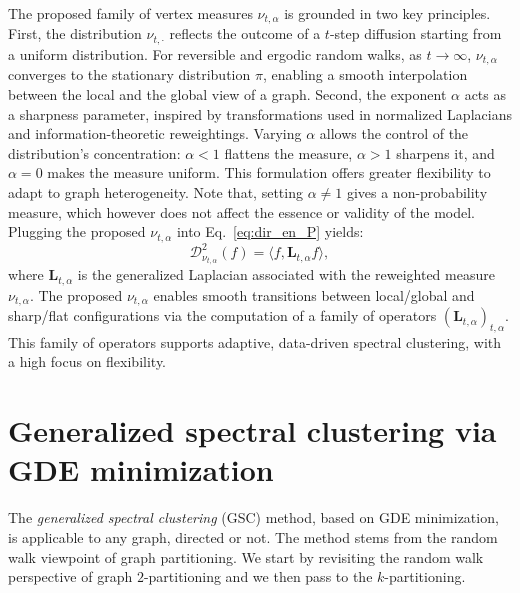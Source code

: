 \documentclass[10pt]{article} %
\def\eqref#1{equation~\ref{#1}}
\def\rmL{{\mathbf{L}}}
\newcommand{\GDE}{GDE\xspace}
\newcommand{\D}[2]{\mathcal{D}^2_{#1}(#2)}
\renewcommand{\eqref}[1]{\ref{#1}}
\begin{document}
%
The proposed family of vertex measures $\nu_{t, \alpha}$ is grounded in two key principles. First, the distribution $\nu_{t, \cdot}$ reflects the outcome of a $t$-step diffusion starting from a uniform distribution. For reversible and ergodic random walks, as $t \to \infty$, $\nu_{t, \alpha}$ converges to the stationary distribution $\pi$, enabling a smooth interpolation between the local and the global view of a graph. Second, the exponent $\alpha$ acts as a sharpness parameter, inspired by transformations used in normalized Laplacians and information-theoretic reweightings. Varying $\alpha$ allows the control of the distribution's concentration: $\alpha < 1$ flattens the measure, $\alpha > 1$ sharpens it, and $\alpha = 0$ makes the measure uniform. This formulation offers greater flexibility to adapt to graph heterogeneity. Note that, setting $\alpha \neq 1$ gives a non-probability measure, which however does not affect the essence or validity of the model. %
Plugging the proposed $\nu_{t,\alpha}$ into Eq.~\eqref{eq:dir_en_P} yields:
\begin{equation} \label{gde:power_alpha}
  \D{\nu_{t,\alpha}}{f} = \langle f, \rmL_{t,\alpha} f \rangle,
\end{equation}
%
where $\rmL_{t,\alpha}$ is the generalized Laplacian associated with the reweighted measure $\nu_{t,\alpha}$. The proposed $\nu_{t,\alpha}$ %
enables smooth transitions between local/global and sharp/flat configurations via the computation of a family of operators $(\rmL_{t, \alpha})_{t, \alpha}$. This family of operators supports adaptive, data-driven spectral clustering, with a high focus on flexibility.

\section{Generalized spectral clustering via GDE minimization} \label{sec:gsc}
%
The \emph{generalized spectral clustering} (GSC) method, based on \GDE minimization, is applicable to any graph, directed or not. The method stems from the random walk viewpoint of graph partitioning. We start by revisiting the random walk perspective of graph $2$-partitioning and we then pass to the $k$-partitioning.
\end{document}
